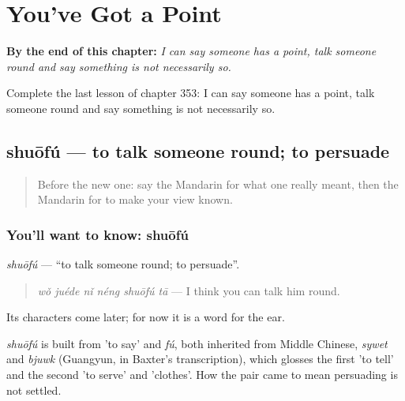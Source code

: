 
\chapter{You've Got a Point}
\label{ch:zh-you-ve-got-a-point}

\begin{chapteropening}
\textbf{By the end of this chapter:} \emph{I can say someone has a point, talk someone round and say something is not necessarily so.}

Complete the last lesson of chapter 353: I can say someone has a point, talk someone round and say something is not necessarily so.
\end{chapteropening}

\section[shuōfú]{shuōfú — to talk someone round; to persuade}

\label{lesson:ZH-C353-shuofu}



\begin{quote}
Before the new one: say the Mandarin for what one really meant, then the Mandarin for to make your view known.
\end{quote}

\subsection*{You'll want to know: shuōfú}
\emph{shuōfú} — \textquotedblleft{}to talk someone round; to persuade\textquotedblright{}.

\begin{quote}
\emph{wǒ juéde nǐ néng shuōfú tā} — I think you can talk him round.
\end{quote}

Its characters come later; for now it is a word for the ear.

\begin{cousinweb}
\emph{shuōfú} is built from  'to say' and \emph{fú}, both inherited from Middle Chinese, \emph{sywet} and \emph{bjuwk} (Guangyun, in Baxter's transcription), which glosses the first 'to tell' and the second 'to serve' and 'clothes'. How the pair came to mean persuading is not settled.
\end{cousinweb}


